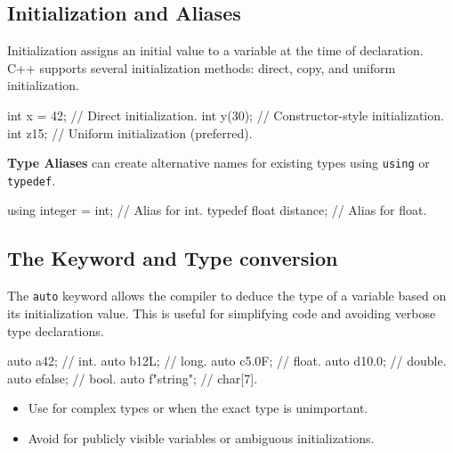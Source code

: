 \subsection{Initialization and Aliases}

Initialization assigns an initial value to a variable at the time of declaration. C++ supports several initialization methods: direct, copy, and uniform initialization.

\begin{codeblock}[language=C++, numbers=none]
int x = 42;     // Direct initialization.
int y(30);      // Constructor-style initialization.
int z{15};      // Uniform initialization (preferred).
\end{codeblock}

\textbf{Type Aliases} can create alternative names for existing types using \texttt{using} or \texttt{typedef}.

\begin{codeblock}[language=C++, numbers=none]
using integer = int;    // Alias for int.
typedef float distance; // Alias for float.
\end{codeblock}

\subsection{The  Keyword and Type conversion}

The \texttt{auto} keyword allows the compiler to deduce the type of a variable based on its initialization value. This is useful for simplifying code and avoiding verbose type declarations.

\begin{codeblock}[language=C++, numbers=none]
auto a{42};         // int.
auto b{12L};        // long.
auto c{5.0F};       // float.
auto d{10.0};       // double.
auto e{false};      // bool.
auto f{"string"};   // char[7].
\end{codeblock}

\begin{tipsblock}
    \begin{itemize}
        \item Use  for complex types or when the exact type is unimportant.
        \item Avoid  for publicly visible variables or ambiguous initializations.
    \end{itemize}
\end{tipsblock}

